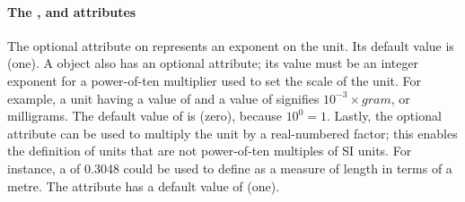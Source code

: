 \paragraph{The ,  and  attributes}
The optional  attribute on \Unit represents an
exponent on the unit.  Its default value is  (one).  A
\Unit object also has an optional  attribute; its
value must be an integer exponent for a power-of-ten multiplier
used to set the scale of the unit.  For example, a unit having a
 value of  and a  value of
 signifies $10^{-3} \times gram$, or milligrams.  The default
value of  is  (zero), because $10^0 = 1$.
Lastly, the optional  attribute can be used to
multiply the  unit by a real-numbered factor; this
enables the definition of units that are not power-of-ten
multiples of SI units.  For instance, a  of
0.3048 could be used to define  as a measure of length
in terms of a metre.  The  attribute has a default
value of  (one).

\newcommand{\ynew}{\ensuremath{y}\xspace}
\newcommand{\ybase}{\ensuremath{y_b}\xspace}
\newcommand{\unew}{\ensuremath{\{u\}}\xspace}
\newcommand{\ubase}{\ensuremath{\{u_b\}}\xspace}

